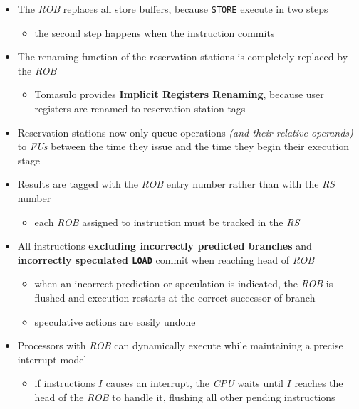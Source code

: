 \documentclass[english]{article}
\begin{document}
\begin{itemize}
  \item The \textit{ROB} replaces all store buffers, because \texttt{STORE} execute in two steps
        \begin{itemize}
          \item the second step happens when the instruction commits
        \end{itemize}
  \item The renaming function of the reservation stations is completely replaced by the \textit{ROB}
        \begin{itemize}
          \item Tomasulo provides \textbf{Implicit Registers Renaming}, because user registers are renamed to reservation station tags
        \end{itemize}
  \item Reservation stations now only queue operations \textit{(and their relative operands)} to \textit{FUs} between the time they issue and the time they begin their execution stage
  \item Results are tagged with the \textit{ROB} entry number rather than with the \textit{RS} number
        \begin{itemize}
          \item each \textit{ROB} assigned to instruction must be tracked in the \textit{RS}
        \end{itemize}
  \item All instructions \textbf{excluding incorrectly predicted branches} and \textbf{incorrectly speculated \texttt{LOAD}} commit when reaching head of \textit{ROB}
        \begin{itemize}
          \item when an incorrect prediction or speculation is indicated, the \textit{ROB} is flushed and execution restarts at the correct successor of branch
          \item speculative actions are easily undone
        \end{itemize}
  \item Processors with \textit{ROB} can dynamically execute while maintaining a precise interrupt model
        \begin{itemize}
          \item if instructions \(I\) causes an interrupt, the \textit{CPU} waits until \(I\) reaches the head of the \textit{ROB} to handle it, flushing all other pending instructions
        \end{itemize}
\end{itemize}
\end{document}
